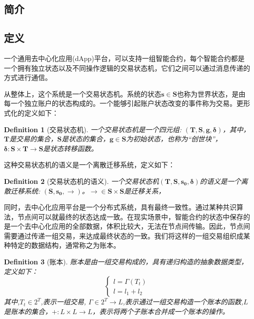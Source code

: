 \documentclass[UTF8,nofonts]{ctexart}
\newtheorem{definition}{Definition}[section]
\begin{document}
\begin{multicols}{2}

\section{简介}
\subsection{定义}

一个通用去中心化应用(dApp)平台，可以支持一组智能合约，每个智能合约都是一个拥有独立状态以及不同操作逻辑的交易状态机，它们之间可以通过消息传递的方式进行通信。

从整体上，这个系统是一个交易状态机。系统的状态$\boldsymbol{s}\in\boldsymbol{S}$也称为世界状态，是由每一个独立账户的状态构成的。一个能够引起账户状态改变的事件称为交易。更形式化的定义如下：

\begin{definition}[交易状态机] \label{def:fsm}
一个交易状态机是一个四元组: $(\boldsymbol{T},\boldsymbol{S},\boldsymbol{g},\boldsymbol{{\delta}})$，其中，$\boldsymbol{T}$是交易的集合，$\boldsymbol{S}$是状态的集合，$\boldsymbol{g} \in \boldsymbol{S}$为初始状态，也称为“创世块”，$\boldsymbol{{\delta}:\boldsymbol{S}\times\boldsymbol{T}\rightarrow\boldsymbol{S}}$是状态转移函数。
\end{definition}

这种交易状态机的语义是一个离散迁移系统，定义如下：
\begin{definition}[交易状态机的语义] \label{def:semantics}
一个交易状态机$(\boldsymbol{T},\boldsymbol{S},\boldsymbol{s_{0}},\boldsymbol{{\delta}})$的语义是一个离散迁移系统: $(\boldsymbol{S},\boldsymbol{s_{0}},\boldsymbol{\rightarrow})$。$\boldsymbol{\rightarrow} \in \boldsymbol{S}\times\boldsymbol{S}$是迁移关系，
\end{definition}

同时，去中心化应用平台是一个分布式系统，具有最终一致性。通过某种共识算法，节点间可以就最终的状态达成一致。在现实场景中，智能合约的状态中保存的是一个去中心化应用的全部数据，体积比较大，无法在节点间传输。因此，节点间需要通过传递一组交易，来达成最终状态的一致。我们将这样的一组交易组织成某种特定的数据结构，通常称之为账本。

\begin{definition}[账本] \label{def:ledger}
账本是由一组交易构成的，具有递归构造的抽象数据类型，定义如下：
$$
\left\{\begin{matrix}
l = \Gamma(T_{t})\\ 
l = l_{1} + l_{2}
\end{matrix}\right.
$$
其中,$T_{t} \in 2^{T}$,表示一组交易, $\Gamma \in 2^{T} \rightarrow L$,表示通过一组交易构造一个账本的函数,$L$是账本的集合，$\boldsymbol{+}: L \times L \rightarrow L$，表示将两个子账本合并成一个账本的操作。
\end{definition}


\end{multicols}
\end{document}
